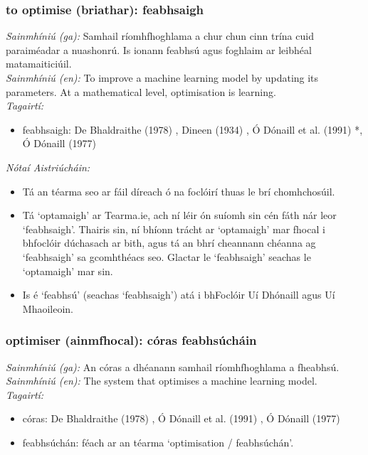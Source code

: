 \subsubsection*{to optimise (briathar): feabhsaigh}
 \noindent \textit{Sainmhíniú (ga):} Samhail ríomhfhoghlama a chur chun cinn trína cuid paraiméadar a nuashonrú. Is ionann feabhsú agus foghlaim ar leibhéal matamaiticiúil.
\\
 \noindent \textit{Sainmhíniú (en):} To improve a machine learning model by updating its parameters. At a mathematical level, optimisation is learning.
\\
 \noindent \textit{Tagairtí:}
\begin{itemize}
	\item feabhsaigh: De Bhaldraithe (1978) \cite{de-bhaldraithe}, Dineen (1934) \cite{dineen}, Ó Dónaill et al. (1991) \cite{focloir-beag}*, Ó Dónaill (1977) \cite{odonaill}
\end{itemize}

 \noindent \textit{Nótaí Aistriúcháin:}
\begin{itemize}
	\item Tá an téarma seo ar fáil díreach ó na foclóirí thuas le brí chomhchosúil.
	\item Tá `optamaigh' ar Tearma.ie, ach ní léir ón suíomh sin cén fáth nár leor `feabhsaigh'. Thairis sin, ní bhíonn trácht ar `optamaigh' mar fhocal i bhfoclóir dúchasach ar bith, agus tá an bhrí cheannann chéanna ag `feabhsaigh' sa gcomhthéacs seo. Glactar le `feabhsaigh' seachas le `optamaigh' mar sin.
	\item Is é `feabhsú' (seachas `feabhsaigh') atá i bhFoclóir Uí Dhónaill agus Uí Mhaoileoin.
\end{itemize}


\subsubsection*{optimiser (ainmfhocal): córas feabhsúcháin}
 \noindent \textit{Sainmhíniú (ga):} An córas a dhéanann samhail ríomhfhoghlama a fheabhsú.
\\
 \noindent \textit{Sainmhíniú (en):} The system that optimises a machine learning model.
\\
 \noindent \textit{Tagairtí:}
\begin{itemize}
	\item córas: De Bhaldraithe (1978) \cite{de-bhaldraithe}, Ó Dónaill et al. (1991) \cite{focloir-beag}, Ó Dónaill (1977) \cite{odonaill}
	\item feabhsúchán: féach ar an téarma `optimisation / feabhsúchán'.
\end{itemize}

